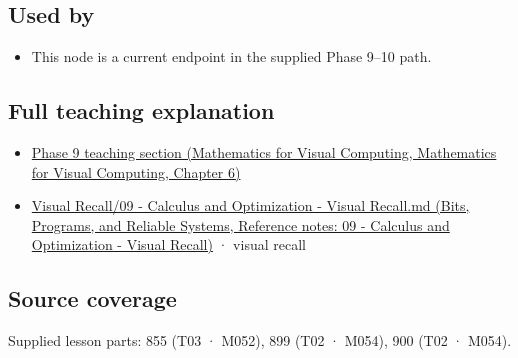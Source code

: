 \subsection{Used by}\label{appendix-8836553d56fc-used-by}

\begin{itemize}
\tightlist
\item
  This node is a current endpoint in the supplied Phase 9--10 path.
\end{itemize}

\subsection{Full teaching explanation}\label{appendix-8836553d56fc-full-teaching-explanation}

\begin{itemize}
\tightlist
\item
  \href{../02-Mathematics-for-Visual-Computing/main.pdf\#nameddest=02-foundations-ii-ch022-numerical-differentiation-and-automatic-differentiation}{Phase 9 teaching section (Mathematics for Visual Computing, Mathematics for Visual Computing, Chapter 6)}
\item
  \href{../01-Bits-Programs-and-Reliable-Systems/main.pdf\#nameddest=appendix-adf48f5dc5c1}{Visual Recall/09 - Calculus and Optimization - Visual Recall.md (Bits, Programs, and Reliable Systems, Reference notes: 09 - Calculus and Optimization - Visual Recall)} · visual recall
\end{itemize}

\subsection{Source coverage}\label{appendix-8836553d56fc-source-coverage}

Supplied lesson parts: 855 (T03 · M052), 899 (T02 · M054), 900 (T02 · M054).
